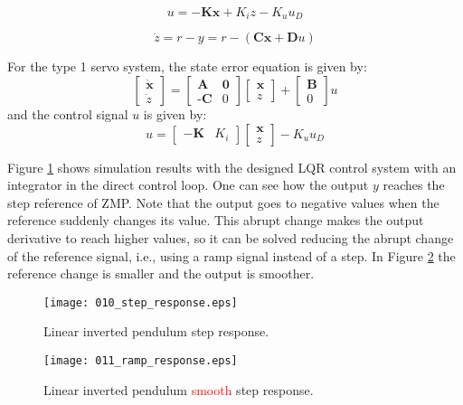 \begin{equation}
u = - \textbf{K}\textbf{x} + K_i z - K_u u_D
\end{equation}

\begin{equation}
\dot{z} = r - y = r - (\textbf{C}\textbf{x} + \textbf{D}u)
\end{equation}

For the type 1 servo system, the state error equation is given by:
\begin{equation}
\begin{bmatrix}
\dot{\textbf{x}}\\
\dot{z}
\end{bmatrix} = 
\begin{bmatrix}
\textbf{A} & \textbf{0}\\
\textbf{-C} & 0
\end{bmatrix}
\begin{bmatrix}
\textbf{x}\\
z
\end{bmatrix} + 
\begin{bmatrix}
\textbf{B}\\
0
\end{bmatrix}
u
\end{equation}
and the control signal $u$ is given by:
\begin{equation}
u = \begin{bmatrix}
-\textbf{K} & K_i
\end{bmatrix}
\begin{bmatrix}
\textbf{x}\\
z 
\end{bmatrix}
- K_u u_D
\end{equation}

Figure \ref{fig:step_response} shows simulation results with the designed LQR control system with an integrator in the direct control loop. One can see how the output $y$ reaches the step reference of ZMP. Note that the output goes to negative values when the reference suddenly changes its value. This abrupt change makes the output derivative to reach higher values, so it can be solved reducing the abrupt change of the reference signal, i.e., using a ramp signal instead of a step. In Figure \ref{fig:ramp_response} the reference change is smaller and the output is smoother.

\begin{figure}[!hbt]
\centering
\texttt{[image: 010\_step\_response.eps]}
\caption{Linear inverted pendulum step response.}
\label{fig:step_response}
\end{figure}

\begin{figure}[!hbt]
\centering
\texttt{[image: 011\_ramp\_response.eps]}
\caption{Linear inverted pendulum \textcolor{red}{smooth} step response.}
\label{fig:ramp_response}
\end{figure}








